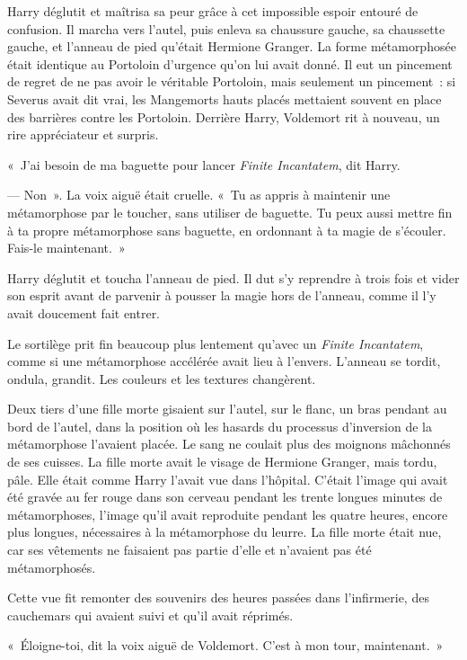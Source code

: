 Harry déglutit et maîtrisa sa peur grâce à cet impossible espoir entouré de confusion.
Il marcha vers l'autel, puis enleva sa chaussure gauche, sa chaussette gauche, et l'anneau de pied qu'était Hermione Granger.
La forme métamorphosée était identique au Portoloin d'urgence qu'on lui avait donné.
Il eut un pincement de regret de ne pas avoir le véritable Portoloin, mais seulement un pincement~: si Severus avait dit vrai, les Mangemorts hauts placés mettaient souvent en place des barrières contre les Portoloin.
Derrière Harry, Voldemort rit à nouveau, un rire appréciateur et surpris.

«~J'ai besoin de ma baguette pour lancer \emph{Finite Incantatem}, dit Harry.

--- Non~».
La voix aiguë était cruelle.
«~Tu as appris à maintenir une métamorphose par le toucher, sans utiliser de baguette.
Tu peux aussi mettre fin à ta propre métamorphose sans baguette, en ordonnant à ta magie de s'écouler.
Fais-le maintenant.~»

Harry déglutit et toucha l'anneau de pied.
Il dut s'y reprendre à trois fois et vider son esprit avant de parvenir à pousser la magie hors de l'anneau, comme il l'y avait doucement fait entrer.

Le sortilège prit fin beaucoup plus lentement qu'avec un \emph{Finite Incantatem}, comme si une métamorphose accélérée avait lieu à l'envers.
L'anneau se tordit, ondula, grandit.
Les couleurs et les textures changèrent.

Deux tiers d'une fille morte gisaient sur l'autel, sur le flanc, un bras pendant au bord de l'autel, dans la position où les hasards du processus d'inversion de la métamorphose l'avaient placée.
Le sang ne coulait plus des moignons mâchonnés de ses cuisses.
La fille morte avait le visage de Hermione Granger, mais tordu, pâle.
Elle était comme Harry l'avait vue dans l'hôpital.
C'était l'image qui avait été gravée au fer rouge dans son cerveau pendant les trente longues minutes de métamorphoses, l'image qu'il avait reproduite pendant les quatre heures, encore plus longues, nécessaires à la métamorphose du leurre.
La fille morte était nue, car ses vêtements ne faisaient pas partie d'elle et n'avaient pas été métamorphosés.

Cette vue fit remonter des souvenirs des heures passées dans l'infirmerie, des cauchemars qui avaient suivi et qu'il avait réprimés.

«~Éloigne-toi, dit la voix aiguë de Voldemort.
C'est à mon tour, maintenant.~»

